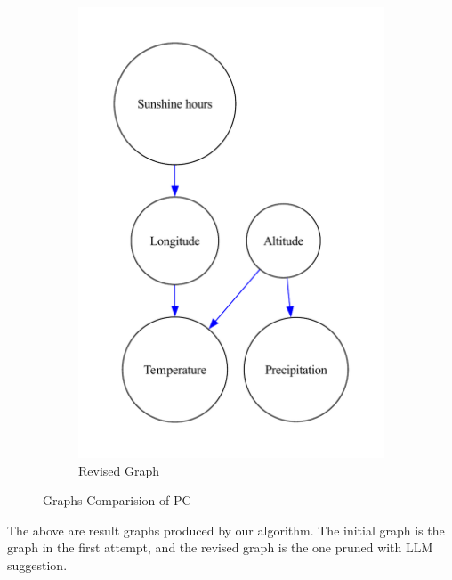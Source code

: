 \documentclass{article}
\begin{document}
\begin{figure}[H]
\begin{subfigure}{0.3\textwidth}
        \label{fig:sub2}
    \end{subfigure}
    \hspace{0.04\textwidth}
    \begin{subfigure}{0.3\textwidth}
        \centering
        \vspace{-0.5cm}
        \includegraphics[width=\linewidth]{data/dataset/DWD/output_graph/revised_graph.pdf}
        \vfill
        \caption{Revised Graph}
        \label{fig:sub3}
    \end{subfigure}
    \caption{Graphs Comparision of PC}
    \label{fig:main}
\end{figure}

The above are result graphs produced by our algorithm. The initial graph is the graph in the first attempt, and the revised graph is the one pruned with LLM suggestion.
\end{document}
